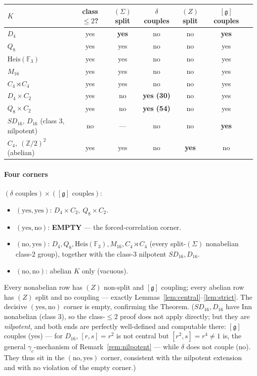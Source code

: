 \documentclass[11pt]{article}
\theoremstyle{definition}
\newcommand{\Z}{\mathbb{Z}}
\newcommand{\F}{\mathbb{F}}
\newcommand{\Inn}{\mathrm{Inn}}
\newcommand{\gerbe}{\mathfrak{g}}
\newcommand{\Heis}{\mathrm{Heis}}
\begin{document}
\begin{center}
\begin{tabular}{lcccccc}
\toprule
$K$ & class $\le2$? & $(\Sigma)$ split & $\delta$ couples & $(Z)$ split & $[\gerbe]$ couples\\
\midrule
$D_4$ & yes & \textbf{yes} & no & no & \textbf{yes}\\
$Q_8$ & yes & yes & no & no & yes\\
$\Heis(\F_3)$ & yes & yes & no & no & yes\\
$M_{16}$ & yes & yes & no & no & yes\\
$C_4\rtimes C_4$ & yes & yes & no & no & yes\\
$D_4\times C_2$ & yes & no & \textbf{yes (30)} & no & yes\\
$Q_8\times C_2$ & yes & no & \textbf{yes (54)} & no & yes\\
$SD_{16},\,D_{16}$ (class $3$, nilpotent) & no & --- & no & no & \textbf{yes}\\
$C_4,\ (\Z/2)^2$ (abelian) & yes & yes & no & \textbf{yes} & no\\
\bottomrule
\end{tabular}
\end{center}

\paragraph{Four corners} $(\delta\text{ couples})\times([\gerbe]\text{ couples})$:
\begin{itemize}
\item $(\text{yes},\text{yes})$: $D_4\times C_2,\ Q_8\times C_2$.
\item $(\text{yes},\text{no})$: \textbf{EMPTY} --- the forced-correlation corner.
\item $(\text{no},\text{yes})$: $D_4,Q_8,\Heis(\F_3),M_{16},C_4\rtimes C_4$ (every
split-$(\Sigma)$ nonabelian class-$2$ group), together with the class-$3$ nilpotent
$SD_{16},D_{16}$.
\item $(\text{no},\text{no})$: abelian $K$ only (vacuous).
\end{itemize}
Every nonabelian row has $(Z)$ non-split and $[\gerbe]$ coupling; every abelian row has $(Z)$
split and no coupling --- exactly Lemmas~\ref{lem:central}--\ref{lem:strict}. The decisive
$(\text{yes},\text{no})$ corner is empty, confirming the Theorem. ($SD_{16},D_{16}$ have
$\Inn$ nonabelian (class $3$), so the class-$\le2$ proof does not apply directly; but they are
\emph{nilpotent}, and both ends are perfectly well-defined and computable there: $[\gerbe]$
couples (yes) --- for $D_{16}$, $[r,s]=r^2$ is not central but $[r^2,s]=r^4\neq1$ is, the general
$\gamma_c$-mechanism of Remark~\ref{rem:nilpotent} --- while $\delta$ does not couple (no). They
thus sit in the $(\text{no},\text{yes})$ corner, consistent with the nilpotent extension and with
no violation of the empty corner.)
\end{document}
